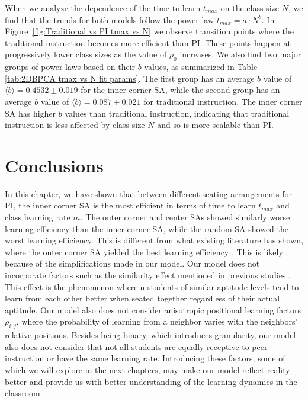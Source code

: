 When we analyze the dependence of the time to learn $t_{max}$ on the class size $N$, we find that the trends for both models follow the power law $t_{max} = a \cdot N^b$. 
In Figure~\ref{fig:Traditional vs PI tmax vs N} we observe transition points where the traditional instruction becomes more efficient than PI. 
These points happen at progressively lower class sizes as the value of $\rho_0$ increases. 
We also find two major groups of power laws based on their $b$ values, as summarized in Table \ref{tab:2DBPCA tmax vs N fit params}. 
The first group has an average $b$ value of $\langle b \rangle = 0.4532 \pm 0.019$ for the inner corner SA, while the second group has an average $b$ value of $\langle b \rangle = 0.087\pm0.021$ for traditional instruction. 
The inner corner SA has higher $b$ values than traditional instruction, indicating that traditional instruction is less affected by class size $N$ and so is more scalable than PI.

\section{Conclusions}
In this chapter, we have shown that between different seating arrangements for PI, the inner corner SA is the most efficient in terms of time to learn $t_{max}$ and class learning rate $m$. 
The outer corner and center SAs showed similarly worse learning efficiency than the inner corner SA, while the random SA showed the worst learning efficiency. 
This is different from what existing literature has shown, where the outer corner SA yielded the best learning efficiency \cite{roxas2010seating}. 
This is likely because of the simplifications made in our model. 
Our model does not incorporate factors such as the similarity effect mentioned in previous studies \cite{roxas2010seating,smith2009peer}. 
This effect is the phenomenon wherein students of similar aptitude levels tend to learn from each other better when seated together regardless of their actual aptitude. 
Our model also does not consider anisotropic positional learning factors $\rho_{i,j}$, where the probability of learning from a neighbor varies with the neighbors' relative positions. 
Besides being binary, which introduces granularity, our model also does not consider that not all students are equally receptive to peer instruction or have the same learning rate. 
Introducing these factors, some of which we will explore in the next chapters, may make our model reflect reality better and provide us with better understanding of the learning dynamics in the classroom.

